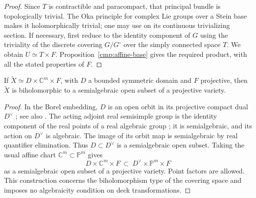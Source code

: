 \begin{proof}
Since $T$ is contractible and paracompact, that principal bundle is
topologically trivial.  The Oka principle for complex Lie groups
over a Stein base makes it holomorphically trivial; one may use
\cite[Theorem~1.3 and Example~(A)]{ForstnericPrezelj2000} on its
continuous trivializing section.  If necessary, first reduce to
the identity component of $G$ using the triviality of the discrete
covering $G/G^\circ$ over the simply connected space $T$.
We obtain $U\simeq T\times F$.  Proposition~\ref{cmp:affine-base}
gives the required product, with all the stated properties of $F$.
\end{proof}

\begin{proposition}
\label{cmp:converse}
If $\widetilde X\simeq D\times\mathbb C^m\times F$, with $D$ a
bounded symmetric domain and $F$ projective, then $\widetilde X$ is
biholomorphic to a semialgebraic open subset of a projective variety.
\end{proposition}

\begin{proof}
In the Borel embedding, $D$ is an open orbit in its projective
compact dual $D^\vee$ \cite[\S4, Theorem~2 and \S6, Proposition~2]{Borel1954};
see also \cite[\S2.1.1, Borel embedding theorem]{FalbelGuillouxWill2024}.
The acting adjoint real semisimple group is
the identity component of the real points of a real algebraic group
\cite[Proposition~1.7]{Milne2005}; it is semialgebraic, and its action on $D^\vee$ is algebraic.
The image of its orbit map is semialgebraic by real quantifier
elimination.  Thus $D\subset D^\vee$ is a semialgebraic open subset.
Taking the usual affine chart $\mathbb C^m\subset\mathbb P^m$ gives
\[
 D\times\mathbb C^m\times F
        \ \subset\ D^\vee\times\mathbb P^m\times F
\]
as a semialgebraic open subset of a projective variety.  Point
factors are allowed.  This construction concerns the biholomorphism
type of the covering space and imposes no algebraicity condition on
deck transformations.
\end{proof}
